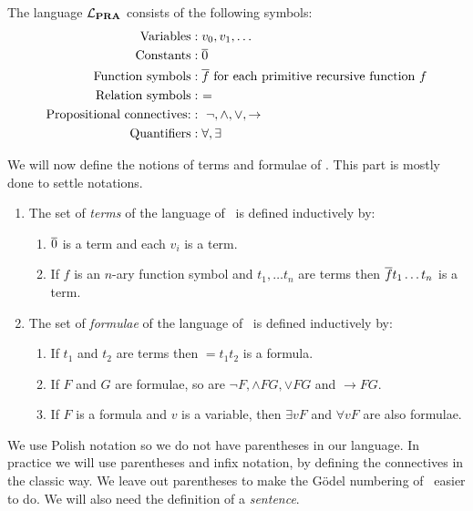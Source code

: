 \documentclass[../main.tex]{subfiles}
\begin{document}
\begin{defi}
	The language $\mathcal{L}_{\text{\textbf{PRA}}}$ consists of the following symbols:
	\begin{align*}
		\text{Variables}&: v_0,v_1,\ldots \\
		\text{Constants} &: \overline{0}\\
		\text{Function symbols} &: \overline f\ \text{for each primitive
		recursive function}\ f\\
			\text{Relation symbols} &:\ =\\
			\text{Propositional connectives:} &:\
			\neg,\wedge,\vee,\rightarrow\\
			\text{Quantifiers} &: \forall,\exists
	\end{align*}
\end{defi}
We will now define the notions of terms and formulae of \PRA. This part is
mostly done to settle notations.

\begin{defi}
	\begin{enumerate}
		\item The set of \textit{terms} of the language of \PRA\ is
			defined inductively by:
			\begin{enumerate}
				\item $\overline 0$ is a term and each $v_i$ is a
					term.
				\item If $f$ is an $n$-ary function symbol and
					$t_1,\ldots t_n$ are terms then $\overline
					f t_1\ldots t_n$ is a term.
			\end{enumerate}
		\item The set of \textit{formulae} of the language of  \PRA\ is
			defined inductively by:
			\begin{enumerate}
				\item If $t_1$ and $t_2$ are terms then 
					$=t_1t_2$ is a formula.
				\item If $F$ and $ G$ are formulae,
					so are
					$\neg F,\wedge F G,\vee F G$
					and $\rightarrow F G$.
				\item If $F$ is a formula and $v$ is a
					variable, then $\exists vF$ and
					$\forall vF$ are also formulae.
			\end{enumerate}
	\end{enumerate}
\end{defi}
We use Polish notation so we do not have parentheses in our language. In
practice we will use parentheses and infix notation, by defining the
connectives in the classic way. We leave out parentheses to make the Gödel
numbering of \PRA\ easier to do.  We will also need the
definition of a \textit{sentence}.
\end{document}
